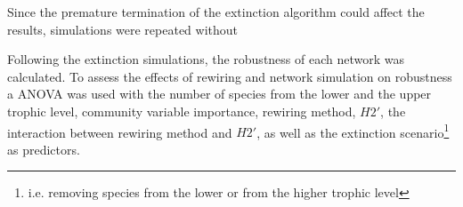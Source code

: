 \documentclass[12pt,a4paper]{article}
\begin{document}
Since the premature termination of the extinction algorithm could affect the results, simulations were repeated without 


Following the extinction simulations, the robustness of each network was calculated. To assess the effects of rewiring and network simulation on robustness a ANOVA was used with the number of species from the lower and the upper trophic level, community variable importance, rewiring method, $H2'$, the interaction between rewiring method and $H2'$, as well as the extinction scenario\footnote{i.e. removing species from the lower or from the higher trophic level} as predictors.

 
\end{document}
